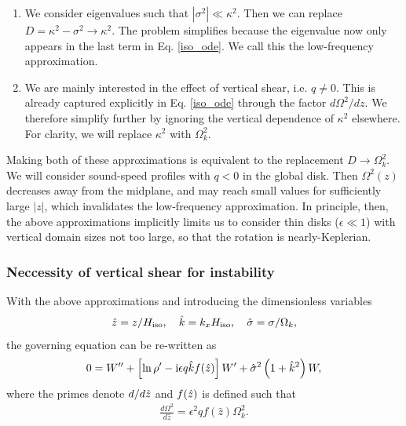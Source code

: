 \begin{enumerate}
\item We consider eigenvalues such that
  $|\sigma^2|\ll \kappa^2$. Then we can replace $D=\kappa^2 -\sigma^2\to
  \kappa^2$. The problem simplifies because the eigenvalue now only
  appears in the last term in Eq. \ref{iso_ode}. We call this the
  low-frequency approximation. 
\item We are mainly interested in the effect of vertical shear, i.e. $q\neq
  0$. This is already captured explicitly in Eq. \ref{iso_ode} through
  the factor $d\Omega^2/dz$. We therefore simplify further by ignoring
  the vertical dependence of $\kappa^2$ elsewhere. For clarity, we
  will replace $\kappa^2$ with $\Omega_k^2$. 
\end{enumerate}
Making both of these approximations is equivalent to the replacement
$D\to\Omega_k^2$.  We will consider sound-speed profiles with $q<0$ in the global 
disk. Then $\Omega^2(z)$ decreases away from the midplane,
and may reach small values for sufficiently large $|z|$, which
invalidates the low-frequency approximation. In principle, then, the
above approximations implicitly limits us to consider thin disks ($\epsilon
\ll 1$) with vertical domain sizes not too large, so that the rotation
is nearly-Keplerian.   


\subsubsection{Neccessity of vertical shear for
  instability}\label{integral_relation} 
With the above approximations and introducing the dimensionless variables
\begin{align}
  \hat{z} = z/H_\mathrm{iso},\quad \hat{k}=k_xH_\mathrm{iso}, \quad \hat{\sigma} = \sigma/\Omega_k,
\end{align}
the governing equation can be re-written as
\begin{align}
  0 = W^{\prime\prime} + \left[\ln\rho^\prime - \mathrm{i} \epsilon q \hat{k}
    f(\hat{z})\right]W^\prime + \hat{\sigma}^2\left(1+\hat{k}^2\right)W,\label{iso_ode1}
\end{align}
where the primes denote $d/d\hat{z}$ and $f(\hat{z})$ is defined such that
\begin{align}\label{fz_shear}
  \frac{d\Omega^2}{d\hat{z}} = \epsilon^2q f(\hat{z})\Omega_k^2.
\end{align}

